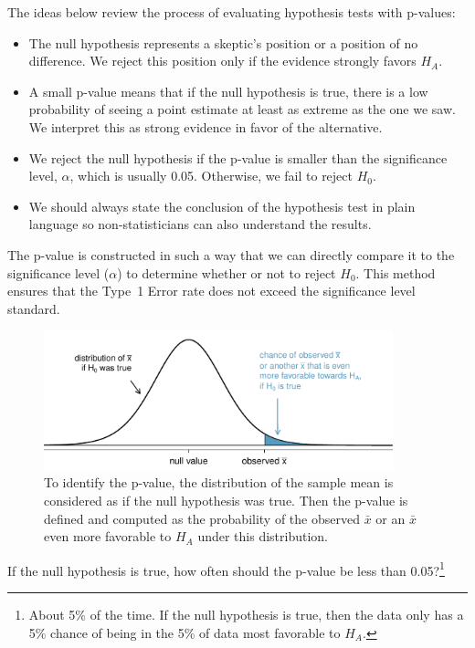 The ideas below review the process of evaluating hypothesis tests with p-values:
\begin{itemize}
\setlength{\itemsep}{0mm}
\item The null hypothesis represents a skeptic's position or a position of no difference. We reject this position only if the evidence strongly favors $H_A$.
\item A small p-value means that if the null hypothesis is true, there is a low probability of seeing a point estimate at least as extreme as the one we saw. We interpret this as strong evidence in favor of the alternative.
\item We reject the null hypothesis if the p-value is smaller than the significance level, $\alpha$, which is usually 0.05. Otherwise, we fail to reject $H_0$.
\item We should always state the conclusion of the hypothesis test in plain language so non-statisticians can also understand the results.
\end{itemize}

The p-value is constructed in such a way that we can directly compare it to the significance level ($\alpha$) to determine whether or not to reject $H_0$. This method ensures that the Type~1 Error rate does not exceed the significance level standard. 

\begin{figure}[ht]
   \centering
   \includegraphics[width=0.9\textwidth]{ch_inference_foundations/figures/pValueOneSidedSleepStudyExplained/pValueOneSidedSleepStudyExplained}
   \caption{To identify the p-value, the distribution of the sample mean is considered as if the null hypothesis was true. Then the p-value is defined and computed as the probability of the observed $\bar{x}$ or an $\bar{x}$ even more favorable to $H_A$ under this distribution.}
   \label{pValueOneSidedSleepStudyExplained}
\end{figure}

\begin{exercise}
If the null hypothesis is true, how often should the p-value be less than 0.05?\footnote{About 5\% of the time. If the null hypothesis is true, then the data only has a 5\% chance of being in the 5\% of data most favorable to $H_A$.}
\end{exercise}

